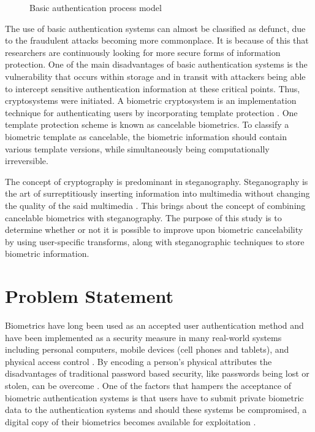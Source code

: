 \begin{figure}[hbtp]
\centering

\caption{ Basic authentication process model}
\label{fig:basic_authentication_process_model}
\end{figure}

The use of basic authentication systems can almost be classified as defunct, due to the fraudulent attacks becoming more commonplace. It is because of this that researchers are continuously looking for more secure forms of information protection. One of the main disadvantages of basic authentication systems is the vulnerability that occurs within storage and in transit with attackers being able to intercept sensitive authentication information at these critical points. Thus, cryptosystems were initiated. A biometric cryptosystem is an implementation technique for authenticating users by incorporating template protection \cite{Uludag2004}. One template protection scheme is known as cancelable biometrics. To classify a biometric template as cancelable, the biometric information should contain various template versions, while simultaneously being computationally irreversible. 

The concept of cryptography is predominant in steganography. Steganography is the art of surreptitiously inserting information into multimedia without changing the quality of the said multimedia \cite{Kishor2016}. This brings about the concept of combining cancelable biometrics with steganography.
The purpose of this study is to determine whether or not it is possible to improve upon biometric cancelability by using user-specific transforms, along with steganographic techniques to store biometric information.




\section{Problem Statement} %


Biometrics have long been used as an accepted user authentication method and have been implemented as a security measure in many real-world systems including personal computers, mobile devices (cell phones and tablets), and physical access control \cite{Liu2001}. By encoding a person’s physical attributes the disadvantages of traditional password based security, like passwords being lost or stolen, can be overcome \cite{Jain2016}. One of the factors that hampers the acceptance of biometric authentication systems is that users have to submit private biometric data to the authentication systems and should these systems be compromised, a digital copy of their biometrics becomes available for exploitation \cite{Rathgeb2011}.

